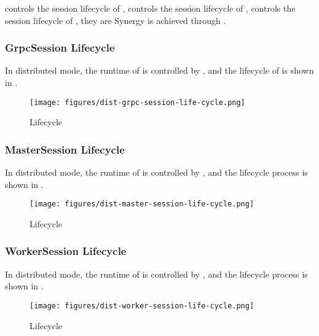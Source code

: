 \begin{content}
 controls the session lifecycle of ,  controls the session lifecycle of ,  controls the session lifecycle of , they are Synergy is achieved through .

\subsubsection{GrpcSession Lifecycle}

In distributed mode, the runtime of  is controlled by , and the lifecycle of  is shown in .

\begin{figure}[H]
\centering
\texttt{[image: figures/dist-grpc-session-life-cycle.png]}
\caption{Lifecycle}
 \label{fig:dist-grpc-session-life-cycle}
\end{figure}

\subsubsection{MasterSession Lifecycle}

In distributed mode, the runtime of  is controlled by , and the  lifecycle process is shown in .

\begin{figure}[H]
\centering
\texttt{[image: figures/dist-master-session-life-cycle.png]}
\caption{Lifecycle}
 \label{fig:dist-master-session-life-cycle}
\end{figure}

\subsubsection{WorkerSession Lifecycle}

In distributed mode, the runtime of  is controlled by , and the  lifecycle process is shown in .

\begin{figure}[H]
\centering
\texttt{[image: figures/dist-worker-session-life-cycle.png]}
\caption{Lifecycle}
 \label{fig:dist-worker-session-life-cycle}
\end{figure}


\end{content}
